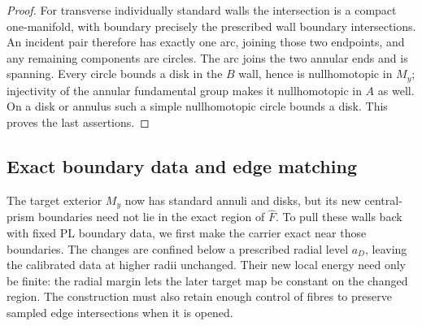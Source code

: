 \begin{proof}
For transverse individually standard walls the intersection is a
compact one-manifold, with boundary precisely the prescribed wall
boundary intersections.  An incident pair therefore has exactly one
arc, joining those two endpoints, and any remaining components are
circles.  The arc joins the two annular ends and is spanning.  Every
circle bounds a disk in the $B$ wall, hence is nullhomotopic in $M_y$;
injectivity of the annular fundamental group makes it nullhomotopic
in $A$ as well.  On a disk or annulus such a simple nullhomotopic
circle bounds a disk.  This proves the last assertions.
\end{proof}

\subsection{Exact boundary data and edge matching}

The target exterior $M_y$ now has standard annuli and disks, but its
new central-prism boundaries need not lie in the exact region of
$\widehat F$.  To pull these walls back with fixed PL boundary data,
we first make the carrier exact near those boundaries.  The changes
are confined below a prescribed radial level $a_D$, leaving the
calibrated data at higher radii unchanged.  Their new local energy
need only be finite: the radial margin lets the later target map be
constant on the changed region.  The construction must also retain enough control of
fibres to preserve sampled edge intersections when it is opened.

